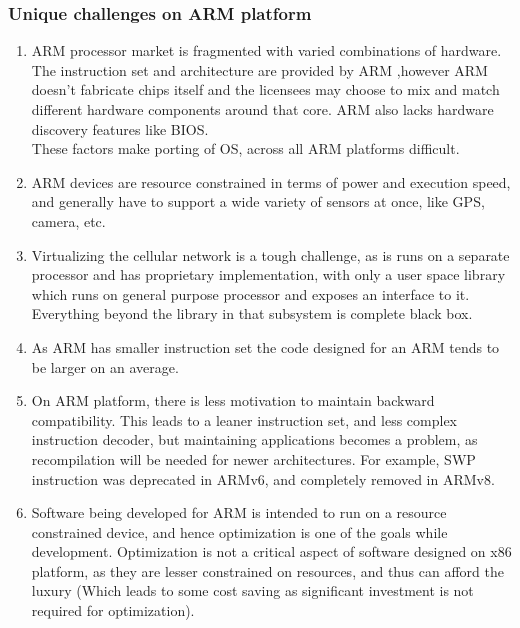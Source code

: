 \documentclass[seminar,twoside]{iitbreport}
\begin{document}
\subsubsection{Unique challenges on ARM platform}
\begin{enumerate}
 
\item ARM processor market is fragmented with varied combinations of hardware. The instruction set and architecture are provided by ARM ,however ARM doesn't fabricate chips itself and the licensees may choose to mix and match different hardware components around that core. ARM also lacks hardware discovery features like BIOS.
\\These factors make porting of OS, across all ARM platforms difficult.

\item ARM devices are resource constrained in terms of power and execution speed, and generally have to support a wide variety of sensors at once, like GPS, camera, etc.

\item Virtualizing the cellular network is a tough challenge, as is runs on a separate processor and has proprietary implementation, with only a user space library which runs on general purpose processor and exposes an interface to it. Everything beyond the library in that subsystem is complete black box.

\item As ARM has smaller instruction set the code designed for an ARM tends to be larger on an average.

\item On ARM platform, there is less motivation to maintain backward compatibility. This leads to a leaner instruction set, and less complex instruction decoder, but
maintaining applications becomes a problem, as recompilation will be needed for newer architectures. For example, SWP instruction was deprecated in ARMv6, and completely
removed in ARMv8.

\item Software being developed for ARM is intended to run on a resource constrained device, and hence optimization is one of the goals while development. Optimization is not a critical aspect of software designed on x86 platform, as they are lesser constrained on resources, and thus can afford the luxury (Which leads to some cost saving as significant investment is not required for optimization).

\end{enumerate}
\end{document}
